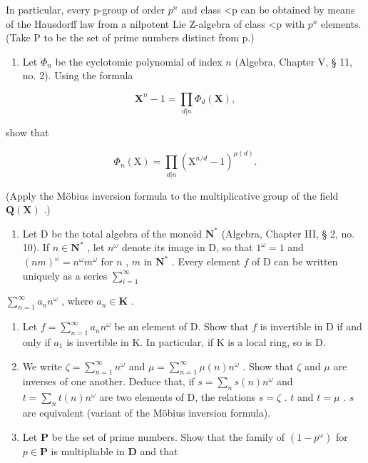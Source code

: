 In particular, every p-group of order \(p^{n}\) and class \textless p can be obtained by means of the Hausdorff law from a nilpotent Lie Z-algebra of class \textless p with \(p^{n}\) elements. (Take P to be the set of prime numbers distinct from p.)

\exercisesforappendix

\begin{enumerate}
\def\labelenumi{\arabic{enumi}.}
\tightlist
\item
  Let \(\Phi_n\) be the cyclotomic polynomial of index \(n\) (Algebra, Chapter V, § 11, no. 2). Using the formula
\end{enumerate}

\[
\mathbf {X} ^ {n} - 1 = \prod_ {d | n} \Phi_ {d} (\mathbf {X}),
\]

show that

\[
\Phi_ {n} (\mathrm{X}) = \prod_ {d | n} \left(\mathrm{X} ^ {n / d} - 1\right) ^ {\mu (d)}.
\]

(Apply the Möbius inversion formula to the multiplicative group of the field \(\mathbf{Q}(\mathbf{X})\) .)

\begin{enumerate}
\def\labelenumi{\arabic{enumi}.}
\setcounter{enumi}{1}
\tightlist
\item
  Let D be the total algebra of the monoid \(\mathbf{N}^*\) (Algebra, Chapter III, § 2, no. 10). If \(n \in \mathbf{N}^*\) , let \(n^\omega\) denote its image in D, so that \(1^\omega = 1\) and \((nm)^\omega = n^\omega m^\omega\) for \(n\) , \(m\) in \(\mathbf{N}^*\) . Every element \(f\) of D can be written uniquely as a series \(\sum_{i=1}^{\infty}\)
\end{enumerate}

\(\sum_{n=1}^{\infty} a_n n^\omega\) , where \(a_n \in \mathbf{K}\) .

\begin{enumerate}
\def\labelenumi{(\alph{enumi})}
\item
  Let \(f = \sum_{n=1}^{\infty} a_n n^\omega\) be an element of D. Show that \(f\) is invertible in D if and only if \(a_1\) is invertible in K. In particular, if K is a local ring, so is D.
\item
  We write \(\zeta = \sum_{n=1}^{\infty} n^{\omega}\) and \(\mu = \sum_{n=1}^{\infty} \mu(n)n^{\omega}\) . Show that \(\zeta\) and \(\mu\) are inverses of one another. Deduce that, if \(s = \sum_{n} s(n)n^{\omega}\) and \(t = \sum_{n} t(n)n^{\omega}\) are two elements of D, the relations \(s = \zeta\) . \(t\) and \(t = \mu\) . \(s\) are equivalent (variant of the Möbius inversion formula).
\item
  Let \(\mathbf{P}\) be the set of prime numbers. Show that the family of \((1 - p^{\omega})\) for \(p\in \mathbf{P}\) is multipliable in \(\mathbf{D}\) and that
\end{enumerate}

